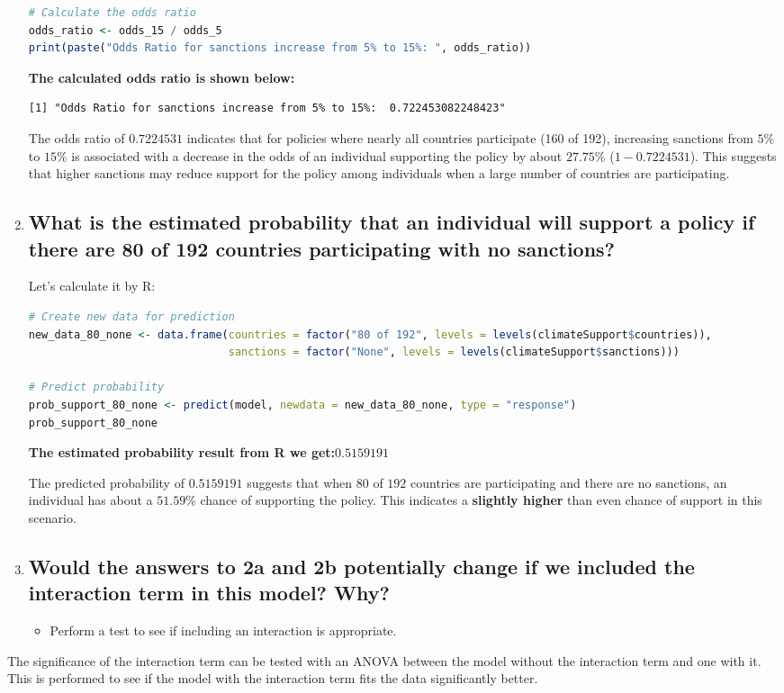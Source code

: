 \documentclass[12pt,letterpaper]{article}
\begin{document}
\begin{enumerate}
\begin{lstlisting}[language=R]
# Calculate the odds ratio
odds_ratio <- odds_15 / odds_5
print(paste("Odds Ratio for sanctions increase from 5% to 15%: ", odds_ratio))
  \end{lstlisting}
\textbf{The calculated odds ratio is shown below:}

\begin{verbatim}
[1] "Odds Ratio for sanctions increase from 5% to 15%:  0.722453082248423"
\end{verbatim}
The odds ratio of $0.7224531$ indicates that for policies where nearly all countries participate (160 of 192), increasing sanctions from $5\%$ to $15\%$ is associated with a decrease in the odds of an individual supporting the policy by about $27.75\%$ ($1 - 0.7224531$). This suggests that higher sanctions may reduce support for the policy among individuals when a large number of countries are participating.
		\item
		\subsection*{What is the estimated probability that an individual will support a policy if there are 80 of 192 countries participating with no sanctions? }

Let's calculate it by R:
\begin{lstlisting}[language=R]
# Create new data for prediction
new_data_80_none <- data.frame(countries = factor("80 of 192", levels = levels(climateSupport$countries)),
                               sanctions = factor("None", levels = levels(climateSupport$sanctions)))

# Predict probability
prob_support_80_none <- predict(model, newdata = new_data_80_none, type = "response")
prob_support_80_none
  \end{lstlisting}

\textbf{The estimated probability result from R we get:$0.5159191$}

The predicted probability of $0.5159191$ suggests that when $80$ of $192$ countries are participating and there are no sanctions, an individual has about a $51.59\%$ chance of supporting the policy. This indicates a\textbf{ slightly higher }than even chance of support in this scenario.

  
		\item
		\subsection*{Would the answers to 2a and 2b potentially change if we included the interaction term in this model? Why?}
		\begin{itemize}
			\item Perform a test to see if including an interaction is appropriate.
		\end{itemize}
	\end{enumerate}
 The significance of the interaction term can be tested with an ANOVA between the model without the interaction term and one with it. This is performed to see if the model with the interaction term fits the data significantly better.
\end{document}
